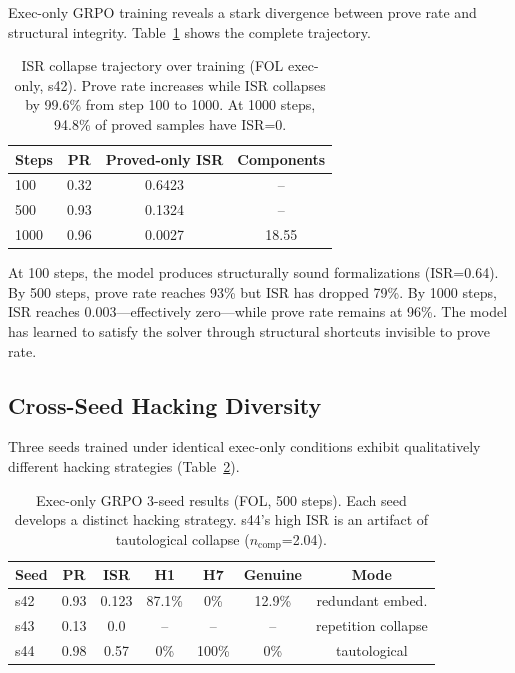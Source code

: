 \documentclass[11pt,a4paper]{article}
\newcommand{\ISR}{\textsc{ISR}}
\newcommand{\GRPO}{\textsc{GRPO}}
\begin{document}
Exec-only \GRPO{} training reveals a stark divergence between prove rate and structural integrity. Table~\ref{tab:isr_collapse} shows the complete trajectory.

\begin{table}[h]
\centering
\small
\begin{tabular}{lccc}
\toprule
\textbf{Steps} & \textbf{PR} & \textbf{Proved-only \ISR{}} & \textbf{Components} \\
\midrule
100 & 0.32 & 0.6423 & -- \\
500 & 0.93 & 0.1324 & -- \\
1000 & 0.96 & 0.0027 & 18.55 \\
\bottomrule
\end{tabular}
\caption{\ISR{} collapse trajectory over training (FOL exec-only, s42). Prove rate increases while \ISR{} collapses by 99.6\% from step 100 to 1000. At 1000 steps, 94.8\% of proved samples have \ISR{}=0.}
\label{tab:isr_collapse}
\end{table}

At 100 steps, the model produces structurally sound formalizations (\ISR{}=0.64). By 500 steps, prove rate reaches 93\% but \ISR{} has dropped 79\%. By 1000 steps, \ISR{} reaches 0.003---effectively zero---while prove rate remains at 96\%. The model has learned to satisfy the solver through structural shortcuts invisible to prove rate.

\subsection{Cross-Seed Hacking Diversity}

Three seeds trained under identical exec-only conditions exhibit qualitatively different hacking strategies (Table~\ref{tab:3seed_exec}).

\begin{table}[h]
\centering
\small
\begin{tabular}{lcccccc}
\toprule
\textbf{Seed} & \textbf{PR} & \textbf{\ISR{}} & \textbf{H1} & \textbf{H7} & \textbf{Genuine} & \textbf{Mode} \\
\midrule
s42 & 0.93 & 0.123 & 87.1\% & 0\% & 12.9\% & redundant embed. \\
s43 & 0.13 & 0.0 & -- & -- & -- & repetition collapse \\
s44 & 0.98 & 0.57 & 0\% & 100\% & 0\% & tautological \\
\bottomrule
\end{tabular}
\caption{Exec-only \GRPO{} 3-seed results (FOL, 500 steps). Each seed develops a distinct hacking strategy. s44's high \ISR{} is an artifact of tautological collapse ($n_{\text{comp}}$=2.04).}
\label{tab:3seed_exec}
\end{table}
\end{document}
